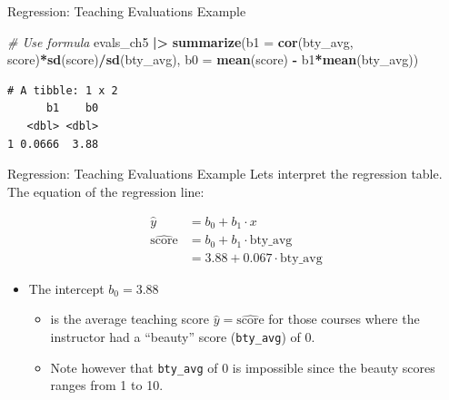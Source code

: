 \documentclass[
  ignorenonframetext,
]{beamer}
\newenvironment{Shaded}{\begin{snugshade}}{\end{snugshade}}
\newcommand{\AttributeTok}[1]{\textcolor[rgb]{0.13,0.29,0.53}{#1}}
\newcommand{\CommentTok}[1]{\textcolor[rgb]{0.56,0.35,0.01}{\textit{#1}}}
\newcommand{\FunctionTok}[1]{\textcolor[rgb]{0.13,0.29,0.53}{\textbf{#1}}}
\newcommand{\NormalTok}[1]{#1}
\newcommand{\SpecialCharTok}[1]{\textcolor[rgb]{0.81,0.36,0.00}{\textbf{#1}}}
\providecommand{\tightlist}{%
  \setlength{\itemsep}{0pt}\setlength{\parskip}{0pt}}
\begin{document}
\begin{frame}[fragile]{Regression: Teaching Evaluations Example}
\protect\hypertarget{regression-teaching-evaluations-example-4}{}
\small

\begin{Shaded}
\begin{Highlighting}[]
\CommentTok{\# Use formula}
\NormalTok{evals\_ch5 }\SpecialCharTok{|\textgreater{}} 
  \FunctionTok{summarize}\NormalTok{(}\AttributeTok{b1 =} \FunctionTok{cor}\NormalTok{(bty\_avg, score)}\SpecialCharTok{*}\FunctionTok{sd}\NormalTok{(score)}\SpecialCharTok{/}\FunctionTok{sd}\NormalTok{(bty\_avg),}
            \AttributeTok{b0 =} \FunctionTok{mean}\NormalTok{(score) }\SpecialCharTok{{-}}\NormalTok{ b1}\SpecialCharTok{*}\FunctionTok{mean}\NormalTok{(bty\_avg))}
\end{Highlighting}
\end{Shaded}

\begin{verbatim}
# A tibble: 1 x 2
      b1    b0
   <dbl> <dbl>
1 0.0666  3.88
\end{verbatim}
\end{frame}

\begin{frame}[fragile]{Regression: Teaching Evaluations Example}
\protect\hypertarget{regression-teaching-evaluations-example-5}{}
Lets interpret the regression table. The equation of the regression
line:

\[
\begin{aligned}
\hat{y} &= b_0 +b_1\cdot x \\
\widehat{\text{score}} &= b_0 + b_1\cdot{\text{bty\_avg}}\\
&= 3.88 + 0.067\cdot\text{bty\_avg}
\end{aligned}
\]

\begin{itemize}
\item
  The intercept \(b_0 = 3.88\)

  \begin{itemize}
  \tightlist
  \item
    is the average teaching score \(\hat{y}=\widehat{\text{score}}\) for
    those courses where the instructor had a ``beauty'' score
    (\texttt{bty\_avg}) of 0.
  \item
    Note however that \texttt{bty\_avg} of 0 is impossible since the
    beauty scores ranges from 1 to 10.
  \end{itemize}
\end{itemize}
\end{frame}
\end{document}
